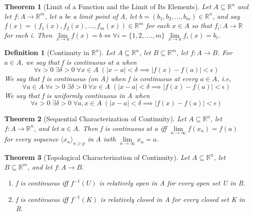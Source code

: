 \documentclass[11pt, oneside]{book}
\theoremstyle{break}
\newtheorem{thm}{Theorem}[section]
\newtheorem{defn}{Definition}[section]
\newcommand{\bb}[1]{\mathbb{#1}}			%
\begin{document}
\begin{thm}[Limit of a Function and the Limit of Its Elements]
	Let $A \subseteq \bb{R}^n$ and let $f:A \to \bb{R}^m$, let a be a limit point of A, let $b = (b_1, b_2, ..., b_m) \in \bb{R}^n$, and say $f(x) = (f_1(x), f_2(x), ..., f_m(x)) \in \bb{R}^m$ for each $x \in A$ so that $f_i: A \to \bb{R}$ for each i. Then $\lim\limits_{x \to a} f(x) = b \iff \forall i = \{1, 2, ...., m\}\; \lim\limits_{x \to a} f_i(x) = b_i$.
\end{thm}

\begin{defn}[Continuity in $\bb{R}^n$]
	Let $A \subseteq \bb{R}^n$, let $B \subseteq \bb{R}^m$, let $f: A \to B$. For $a \in A$, we say that f is continuous at a when
	\begin{equation*}
		\forall \epsilon > 0 \; \exists \delta > 0 \; \forall x \in A \; (|x - a| < \delta \implies |f(x) - f(a)| < \epsilon)
	\end{equation*}
	We say that f is continuous (on A) when f is continuous at every $a \in A$, i.e,
	\begin{equation*}
		\forall a \in A \; \forall \epsilon > 0 \; \exists \delta > 0 \; \forall x \in A \; (|x - a| < \delta \implies |f(x) - f(a)| < \epsilon)
	\end{equation*}
	We say that f is uniformly continuous in A when
	\begin{equation*}
		\forall \epsilon > 0 \; \exists \delta > 0 \; \forall a, x \in A \; (|x - a| < \delta \implies |f(x) - f(a)| < \epsilon)
	\end{equation*}
\end{defn}

\begin{thm}[Sequential Characterization of Continuity]
	Let $A \subseteq \bb{R}^n$, let $f: A \to \bb{R}^n$, and let $a \in A$. Then f is continuous at a iff $\lim\limits_{n \to \infty} f(x_n) = f(a)$ for every sequence $\langle x_n \rangle_{n \geq p}$ in A iwth $\lim\limits_{n \to \infty} x_n = a$.
\end{thm}

\begin{thm}[Topological Characterization of Continuity]
	Let $A \subseteq \bb{R}^n$, let $B \subseteq \bb{R}^m$, and let $f: A \to B$.
	\begin{enumerate}
		\item f is continuous iff $f^{-1}(U)$ is relatively open in A for every open set U in B.
		\item f is continuous iff $f^{-1}(K)$ is relatively closed in A for every closed set K in B.
	\end{enumerate}
\end{thm}
\end{document}
